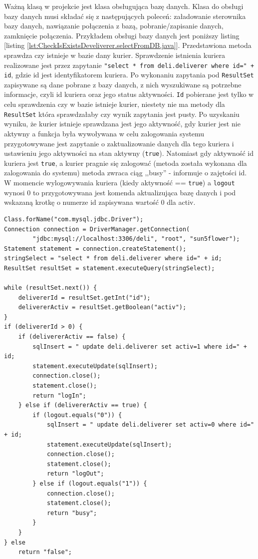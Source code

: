 \documentclass[eng,printmode,oneside]{mgr}
\begin{document}
Ważną klasą w projekcie jest klasa obsługująca bazę danych. Klasa do obsługi
bazy danych musi składać się z następujących poleceń: załadowanie sterownika
bazy danych, nawiązanie połączenia z bazą, pobranie/zapisanie danych, zamknięcie
połączenia. Przykładem obsługi bazy danych jest poniższy listing [listing
\ref{lst:CheckIsExistsDeveliverer.selectFromDB.java}]. Przedstawiona metoda sprawdza czy istnieje w
bazie dany kurier. Sprawdzenie istnienia kuriera realizowane jest przez
zapytanie \texttt{"select * from deli.deliverer where id=" + id}, gdzie id jest
identyfikatorem kuriera. Po wykonaniu zapytania pod \texttt{ResultSet}
zapisywane są dane pobrane z bazy danych, z nich wyszukiwane są potrzebne informacje, czyli
id kuriera oraz jego status aktywności. \texttt{Id} pobierane jest tylko w celu
sprawdzenia czy w bazie istnieje kurier, niestety nie ma metody dla
\texttt{ResultSet} która sprawdzałaby czy wynik zapytania jest pusty. Po
uzyskaniu wyniku, że kurier istnieje sprawdzana jest jego aktywność, gdy kurier
jest nie aktywny a funkcja była wywoływana w celu zalogowania systemu
przygotowywane jest zapytanie o zaktualizowanie danych dla tego kuriera i
ustawieniu jego aktywności na stan aktywny (\texttt{true}). Natomiast gdy
aktywność id kuriera jest \texttt{true}, a kurier pragnie się zalogować (metoda została
wykonana dla zalogowania do systemu) metoda zwraca ciąg ,,busy'' - informuje o zajętości id.
W momencie wylogowywania kuriera (kiedy aktywność == \texttt{true}) a
\texttt{logout} wynosi 0 to przygotowywana jest komenda aktualizująca bazę
danych i pod wskazaną krotkę o numerze id zapisywana wartość 0 dla activ.

\begin{lstlisting}[caption=Połączenia z bazą danych na przykładzie metody
sprawdzającej istnienie kuriera oraz jego stan
używanej przez aplikację
mobilną,label=lst:CheckIsExistsDeveliverer.selectFromDB.java]
Class.forName("com.mysql.jdbc.Driver");
Connection connection = DriverManager.getConnection(
		"jdbc:mysql://localhost:3306/deli", "root", "sun5flower");
Statement statement = connection.createStatement();
stringSelect = "select * from deli.deliverer where id=" + id;
ResultSet resultSet = statement.executeQuery(stringSelect);

while (resultSet.next()) {
	delivererId = resultSet.getInt("id");
	delivererActiv = resultSet.getBoolean("activ");
} 
if (delivererId > 0) {
	if (delivererActiv == false) {
		sqlInsert = " update deli.deliverer set activ=1 where id=" + id;
		statement.executeUpdate(sqlInsert);
		connection.close();
		statement.close();
		return "logIn";
	} else if (delivererActiv == true) {
		if (logout.equals("0")) {
			sqlInsert = " update deli.deliverer set activ=0 where id=" + id;
			statement.executeUpdate(sqlInsert);
			connection.close();
			statement.close();
			return "logOut";
		} else if (logout.equals("1")) {
			connection.close();
			statement.close();
			return "busy";
		}
	}
} else
	return "false";
\end{lstlisting}
\end{document}

